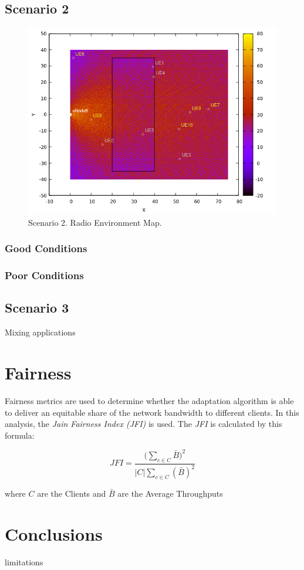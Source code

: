 \subsection{Scenario 2}

\begin{figure}[]
    \centering
    \includegraphics[width=\textwidth]{img/s2i1.png}
    \caption{Scenario 2. Radio Environment Map.}
    \label{fig:s1c1}
\end{figure}

\subsubsection{Good Conditions}


\subsubsection{Poor Conditions}


\subsection{Scenario 3}

Mixing applications


\section{Fairness}
\label{sec:fairness}

Fairness metrics are used to determine whether the adaptation 
algorithm is able to deliver an equitable share of the network bandwidth 
to different clients. In this analysis, the \textit{Jain Fairness Index (JFI)}
\cite{jfi} is used. The \textit{JFI} is calculated by this formula:

\begin{equation}
    JFI=\frac{\bigg(\sum\limits_{c\in C}\bar{B}\bigg)^2}{\left | C \right |\sum\limits_{c\in C}(\bar{B})^2}
\end{equation}

where  $C$ are the Clients and $\bar{B}$ are the Average Throughputs

\section{Conclusions}
\label{sec:simconclu}

limitations